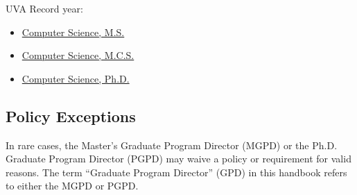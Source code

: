 UVA Record year: \GRcurrentyear

\begin{itemize}[nosep]
\item \href{\GRMS}{Computer Science, M.S.}
\item \href{\GRMCS}{Computer Science, M.C.S.}
\item \href{\GRPHD}{Computer Science, Ph.D.}
\end{itemize}



\subsection{Policy Exceptions}

In rare cases, the Master's Graduate Program Director (MGPD) or the Ph.D.
Graduate Program Director (PGPD) may waive a policy or requirement for valid
reasons. The term ``Graduate Program Director'' (GPD) in this handbook refers to
either the MGPD or PGPD.

